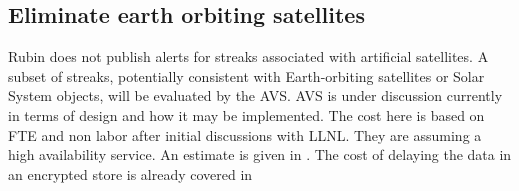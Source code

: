 
\subsection{Eliminate earth orbiting satellites} \label{sec:4eliminate}

Rubin does not publish alerts for streaks associated with artificial satellites.
A subset of streaks, potentially consistent with Earth-orbiting satellites or Solar System objects, will be evaluated by the AVS.
AVS is under discussion currently in terms of design and how it may be implemented.
The cost here is based on FTE  and non labor after initial discussions with LLNL.
They are assuming a high availability service.
An estimate is given in .
The cost of delaying the data in an encrypted store is already covered in 




